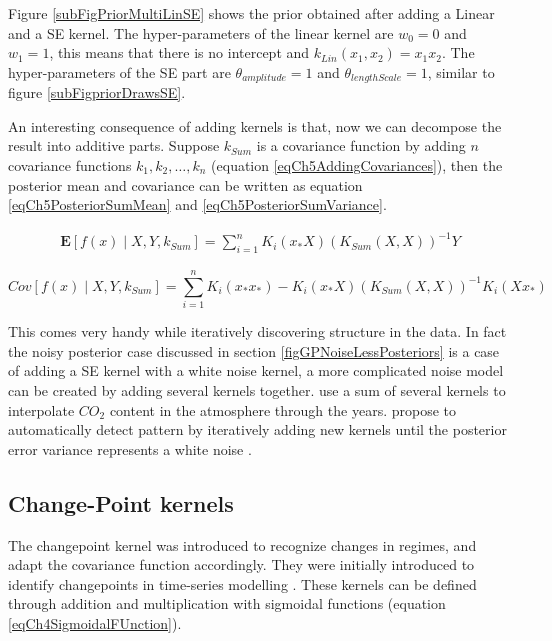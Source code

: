 Figure \ref{subFigPriorMultiLinSE} shows the prior obtained after adding a Linear and a SE kernel. The hyper-parameters of the linear kernel are $w_{0}=0$ and $w_{1}=1$, this means that there is no intercept and $k_{Lin}(x_{1}, x_{2}) = x_{1}x_{2}$. The hyper-parameters of the SE part are $\theta_{amplitude}=1$ and $\theta_{lengthScale}=1$, similar to figure \ref{subFigpriorDrawsSE}. 

An interesting consequence of adding kernels is that, now we can decompose the result into additive parts. Suppose $k_{Sum}$ is a covariance function by adding $n$ covariance functions $k_{1}, k_{2}, \ldots, k_{n}$ (equation \ref{eqCh5AddingCovariances}), then the posterior mean and covariance can be written as equation \ref{eqCh5PosteriorSumMean} and \ref{eqCh5PosteriorSumVariance}. 

\begin{align}\label{eqCh5PosteriorSumMean}
\mathbf{E}[f(x) \mid X, Y, k_{Sum}] = \sum_{i=1}^{n} K_{i}(x_{*}X)( K_{Sum}(X, X))^{-1}Y
\end{align}

\begin{equation}\label{eqCh5PosteriorSumVariance}
Cov[f(x) \mid X, Y, k_{Sum}] = \sum_{i=1}^{n} K_{i}(x_{*}x_{*}) - K_{i}(x_{*}X)( K_{Sum}(X, X) )^{-1}K_{i}(Xx_{*})
\end{equation}

This comes very handy while iteratively discovering structure in the data. In fact the noisy posterior case discussed in section \ref{figGPNoiseLessPosteriors} is a case of adding a SE kernel with a white noise kernel, a more complicated noise model can be created by adding several kernels together. \cite{Rasmussen2005} use a sum of several kernels to interpolate $CO_{2}$ content in the atmosphere through the years. \cite{automaticStatistician} propose to automatically detect pattern by iteratively adding new kernels until the posterior error variance represents a white noise . 

\subsection{Change-Point kernels}\label{subSecCh4CPKernel}
The changepoint kernel was introduced to recognize changes in regimes, and adapt the covariance function accordingly. They were initially introduced to identify changepoints in time-series modelling \cite{osborne2010bayesian, saatcci2010gaussian}. These kernels can be defined through addition and multiplication with sigmoidal functions (equation \ref{eqCh4SigmoidalFUnction}). 

